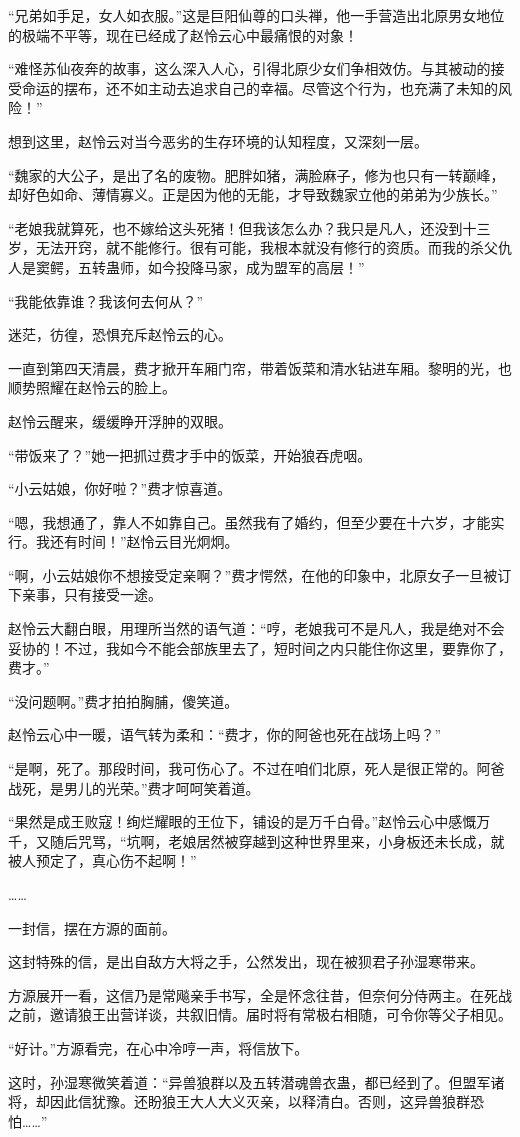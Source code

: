 \begin{this_body}
“兄弟如手足，女人如衣服。”这是巨阳仙尊的口头禅，他一手营造出北原男女地位的极端不平等，现在已经成了赵怜云心中最痛恨的对象！

“难怪苏仙夜奔的故事，这么深入人心，引得北原少女们争相效仿。与其被动的接受命运的摆布，还不如主动去追求自己的幸福。尽管这个行为，也充满了未知的风险！”

想到这里，赵怜云对当今恶劣的生存环境的认知程度，又深刻一层。

“魏家的大公子，是出了名的废物。肥胖如猪，满脸麻子，修为也只有一转巅峰，却好色如命、薄情寡义。正是因为他的无能，才导致魏家立他的弟弟为少族长。”

“老娘我就算死，也不嫁给这头死猪！但我该怎么办？我只是凡人，还没到十三岁，无法开窍，就不能修行。很有可能，我根本就没有修行的资质。而我的杀父仇人是窦鳄，五转蛊师，如今投降马家，成为盟军的高层！”

“我能依靠谁？我该何去何从？”

迷茫，彷徨，恐惧充斥赵怜云的心。

一直到第四天清晨，费才掀开车厢门帘，带着饭菜和清水钻进车厢。黎明的光，也顺势照耀在赵怜云的脸上。

赵怜云醒来，缓缓睁开浮肿的双眼。

“带饭来了？”她一把抓过费才手中的饭菜，开始狼吞虎咽。

“小云姑娘，你好啦？”费才惊喜道。

“嗯，我想通了，靠人不如靠自己。虽然我有了婚约，但至少要在十六岁，才能实行。我还有时间！”赵怜云目光炯炯。

“啊，小云姑娘你不想接受定亲啊？”费才愕然，在他的印象中，北原女子一旦被订下亲事，只有接受一途。

赵怜云大翻白眼，用理所当然的语气道：“哼，老娘我可不是凡人，我是绝对不会妥协的！不过，我如今不能会部族里去了，短时间之内只能住你这里，要靠你了，费才。”

“没问题啊。”费才拍拍胸脯，傻笑道。

赵怜云心中一暖，语气转为柔和：“费才，你的阿爸也死在战场上吗？”

“是啊，死了。那段时间，我可伤心了。不过在咱们北原，死人是很正常的。阿爸战死，是男儿的光荣。”费才呵呵笑着道。

“果然是成王败寇！绚烂耀眼的王位下，铺设的是万千白骨。”赵怜云心中感慨万千，又随后咒骂，“坑啊，老娘居然被穿越到这种世界里来，小身板还未长成，就被人预定了，真心伤不起啊！”

……

一封信，摆在方源的面前。

这封特殊的信，是出自敌方大将之手，公然发出，现在被狈君子孙湿寒带来。

方源展开一看，这信乃是常飚亲手书写，全是怀念往昔，但奈何分侍两主。在死战之前，邀请狼王出营详谈，共叙旧情。届时将有常极右相随，可令你等父子相见。

“好计。”方源看完，在心中冷哼一声，将信放下。

这时，孙湿寒微笑着道：“异兽狼群以及五转潜魂兽衣蛊，都已经到了。但盟军诸将，却因此信犹豫。还盼狼王大人大义灭亲，以释清白。否则，这异兽狼群恐怕……”

\end{this_body}

